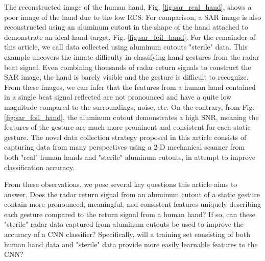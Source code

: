 \documentclass{ieeeaccess}
\begin{document}
The reconstructed image of the human hand, Fig. \ref{fig:sar_real_hand}, shows a poor image of the hand due to the low RCS. For comparison, a SAR image is also reconstructed using an aluminum cutout in the shape of the hand attached to demonstrate an ideal hand target, Fig. \ref{fig:sar_foil_hand}. For the remainder of this article, we call data collected using aluminum cutouts "sterile" data. This example uncovers the innate difficulty in classifying hand gestures from the radar beat signal. Even combining thousands of radar return signals to construct the SAR image, the hand is barely visible and the gesture is difficult to recognize. From these images, we can infer that the features from a human hand contained in a single beat signal reflected are not pronounced and have a quite low magnitude compared to the surroundings, noise, etc. On the contrary, from Fig. \ref{fig:sar_foil_hand}, the aluminum cutout demonstrates a high SNR, meaning the features of the gesture are much more prominent and consistent for each static gesture. The novel data collection strategy proposed in this article consists of capturing data from many perspectives using a 2-D mechanical scanner from both "real" human hands and "sterile" aluminum cutouts, in attempt to improve classification accuracy.

From these observations, we pose several key questions this article aims to answer. Does the radar return signal from an aluminum cutout of a static gesture contain more pronounced, meaningful, and consistent features uniquely describing each gesture compared to the return signal from a human hand? If so, can these "sterile" radar data captured from aluminum cutouts be used to improve the accuracy of a CNN classifier? Specifically, will a training set consisting of both human hand data and "sterile" data provide more easily learnable features to the CNN?
\end{document}
